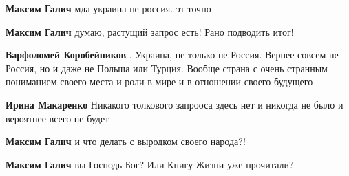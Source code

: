 \begin{itemize}
\begin{itemize}
\textbf{Максим Галич} мда украина не россия. эт точно

 
\textbf{Максим Галич} думаю, растущий запрос есть!
Рано подводить итог!

 
\textbf{Варфоломей Коробейников} . Украина, не только не Россия. Вернее совсем не Россия, но и даже не Польша или Турция. Вообще страна с очень странным пониманием своего места и роли в мире и в отношении своего будущего

 
\textbf{Ирина Макаренко} Никакого толкового запрооса здесь нет и никогда не было и вероятнее всего не будет

 
\textbf{Максим Галич} и что делать с выродком своего народа?!

 
\textbf{Максим Галич} вы Господь Бог? Или
Книгу Жизни уже прочитали?

 

\end{itemize}
\end{itemize}
